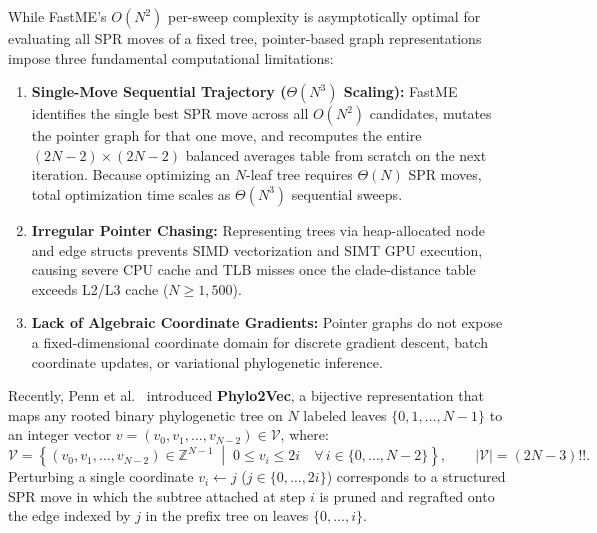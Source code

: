 \documentclass[11pt,a4paper]{article}
\theoremstyle{definition}
\begin{document}
While FastME's $O(N^2)$ per-sweep complexity is asymptotically optimal for evaluating all SPR moves of a fixed tree, pointer-based graph representations impose three fundamental computational limitations:
\begin{enumerate}
    \item \textbf{Single-Move Sequential Trajectory ($\Theta(N^3)$ Scaling):} FastME identifies the single best SPR move across all $O(N^2)$ candidates, mutates the pointer graph for that one move, and recomputes the entire $(2N-2) \times (2N-2)$ balanced averages table from scratch on the next iteration. Because optimizing an $N$-leaf tree requires $\Theta(N)$ SPR moves, total optimization time scales as $\Theta(N^3)$ sequential sweeps.
    \item \textbf{Irregular Pointer Chasing:} Representing trees via heap-allocated node and edge structs prevents SIMD vectorization and SIMT GPU execution, causing severe CPU cache and TLB misses once the clade-distance table exceeds L2/L3 cache ($N \ge 1{,}500$).
    \item \textbf{Lack of Algebraic Coordinate Gradients:} Pointer graphs do not expose a fixed-dimensional coordinate domain for discrete gradient descent, batch coordinate updates, or variational phylogenetic inference.
\end{enumerate}

Recently, Penn et al.~\cite{penn2024phylo2vec} introduced \textbf{Phylo2Vec}, a bijective representation that maps any rooted binary phylogenetic tree on $N$ labeled leaves $\{0, 1, \dots, N-1\}$ to an integer vector $v = (v_0, v_1, \dots, v_{N-2}) \in \mathcal{V}$, where:
\begin{equation}
\mathcal{V} = \left\{ (v_0, v_1, \dots, v_{N-2}) \in \mathbb{Z}^{N-1} \;\middle|\; 0 \le v_i \le 2i \quad \forall \, i \in \{0, \dots, N-2\} \right\}, \qquad |\mathcal{V}| = (2N-3)!!.
\label{eq:phylo2vec_space}
\end{equation}
Perturbing a single coordinate $v_i \leftarrow j$ ($j \in \{0, \dots, 2i\}$) corresponds to a structured SPR move in which the subtree attached at step $i$ is pruned and regrafted onto the edge indexed by $j$ in the prefix tree on leaves $\{0, \dots, i\}$.
\end{document}
